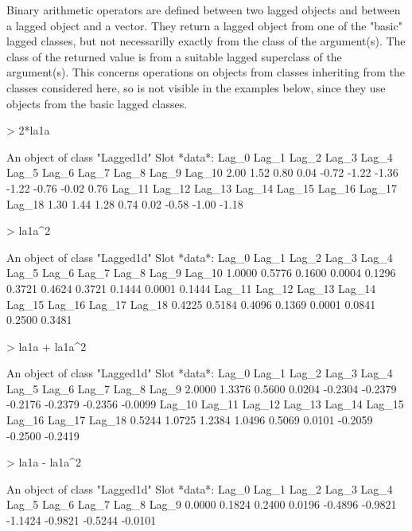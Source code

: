 \documentclass[a4paper,twoside,11pt,nojss,article]{jss}
\begin{document}
Binary arithmetic operators are defined between two lagged objects and between a lagged
object and a vector. They return a lagged object from one of the "basic" lagged classes, but
not necessarilly exactly from the class of the argument(s). The class of the returned value
is from a suitable lagged superclass of the argument(s). This concerns operations on objects
from classes inheriting from the classes considered here, so is not visible in the examples
below, since they use objects from the basic lagged classes.
\begin{Schunk}
\begin{Sinput}
> 2*la1a
\end{Sinput}
\begin{Soutput}
An object of class "Lagged1d"
Slot *data*: 
 Lag_0  Lag_1  Lag_2  Lag_3  Lag_4  Lag_5  Lag_6  Lag_7  Lag_8  Lag_9 Lag_10 
  2.00   1.52   0.80   0.04  -0.72  -1.22  -1.36  -1.22  -0.76  -0.02   0.76 
Lag_11 Lag_12 Lag_13 Lag_14 Lag_15 Lag_16 Lag_17 Lag_18 
  1.30   1.44   1.28   0.74   0.02  -0.58  -1.00  -1.18 
\end{Soutput}
\begin{Sinput}
> la1a^2
\end{Sinput}
\begin{Soutput}
An object of class "Lagged1d"
Slot *data*: 
 Lag_0  Lag_1  Lag_2  Lag_3  Lag_4  Lag_5  Lag_6  Lag_7  Lag_8  Lag_9 Lag_10 
1.0000 0.5776 0.1600 0.0004 0.1296 0.3721 0.4624 0.3721 0.1444 0.0001 0.1444 
Lag_11 Lag_12 Lag_13 Lag_14 Lag_15 Lag_16 Lag_17 Lag_18 
0.4225 0.5184 0.4096 0.1369 0.0001 0.0841 0.2500 0.3481 
\end{Soutput}
\begin{Sinput}
> la1a + la1a^2
\end{Sinput}
\begin{Soutput}
An object of class "Lagged1d"
Slot *data*: 
  Lag_0   Lag_1   Lag_2   Lag_3   Lag_4   Lag_5   Lag_6   Lag_7   Lag_8   Lag_9 
 2.0000  1.3376  0.5600  0.0204 -0.2304 -0.2379 -0.2176 -0.2379 -0.2356 -0.0099 
 Lag_10  Lag_11  Lag_12  Lag_13  Lag_14  Lag_15  Lag_16  Lag_17  Lag_18 
 0.5244  1.0725  1.2384  1.0496  0.5069  0.0101 -0.2059 -0.2500 -0.2419 
\end{Soutput}
\begin{Sinput}
> la1a - la1a^2
\end{Sinput}
\begin{Soutput}
An object of class "Lagged1d"
Slot *data*: 
  Lag_0   Lag_1   Lag_2   Lag_3   Lag_4   Lag_5   Lag_6   Lag_7   Lag_8   Lag_9 
 0.0000  0.1824  0.2400  0.0196 -0.4896 -0.9821 -1.1424 -0.9821 -0.5244 -0.0101 

\end{Soutput}
\end{Schunk}
\end{document}
